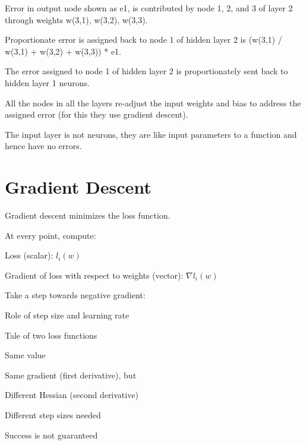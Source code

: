 	\begin{bulletedlist}
		\item Error in output node shown as e1, is contributed by node 1, 2, and 3 of layer 2 through weights w(3,1), w(3,2), w(3,3).
		\item Proportionate error is assigned back to node 1 of hidden layer 2 is (w(3,1) / w(3,1) + w(3,2) + w(3,3)) * e1.
		\item The error assigned to node 1 of hidden layer 2 is proportionately sent back to hidden layer 1 neurons.
		\item All the nodes in all the layers re-adjust the input weights and bias to address the assigned error (for this they use gradient descent).
		\item The input layer is not neurons, they are like input parameters to a function and hence have no errors.
	\end{bulletedlist}


	\section{Gradient Descent}

	\begin{bulletedlist}
		\item Gradient descent minimizes the loss function.
		\item At every point, compute:
		\begin{bulletedlist}
			\item Loss (scalar): $l_i(w)$
			\item Gradient of loss with respect to weights (vector): $\nabla l_i(w)$
			\item Take a step towards negative gradient:
		\end{bulletedlist}
	\end{bulletedlist}

Role of step size and learning rate
	\begin{bulletedlist}
		\item Tale of two loss functions
		\begin{bulletedlist}
			\item Same value
			\item Same gradient (first derivative), but
			\item Different Hessian (second derivative)
			\item Different step sizes needed
		\end{bulletedlist}
		\item Success is not guaranteed
	\end{bulletedlist}

